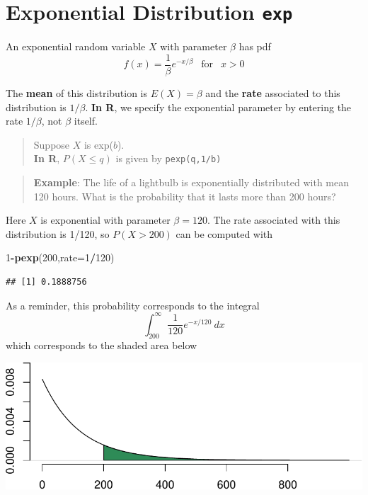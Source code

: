 \documentclass[
]{book}
\newenvironment{Shaded}{\begin{snugshade}}{\end{snugshade}}
\newcommand{\AttributeTok}[1]{\textcolor[rgb]{0.13,0.29,0.53}{#1}}
\newcommand{\DecValTok}[1]{\textcolor[rgb]{0.00,0.00,0.81}{#1}}
\newcommand{\FunctionTok}[1]{\textcolor[rgb]{0.13,0.29,0.53}{\textbf{#1}}}
\newcommand{\NormalTok}[1]{#1}
\newcommand{\SpecialCharTok}[1]{\textcolor[rgb]{0.81,0.36,0.00}{\textbf{#1}}}
\theoremstyle{definition}
\theoremstyle{definition}
\theoremstyle{definition}
\theoremstyle{definition}
\theoremstyle{remark}
\begin{document}
\section{\texorpdfstring{Exponential Distribution \texttt{exp}}{Exponential Distribution exp}}\label{expR}

An exponential random variable \(X\) with parameter \(\beta\) has pdf \[f(x) = \frac{1}{\beta}e^{-x/\beta} ~~\text{ for }~~ x > 0\]

The \textbf{mean} of this distribution is \(E(X) = \beta\) and the \textbf{rate} associated to this distribution is \(1/\beta\). \textbf{In R}, we specify the exponential parameter by entering the rate \(1/\beta\), not \(\beta\) itself.

\begin{quote}
Suppose \(X\) is exp(\(b\)).\\
\textbf{In R}, \(P(X \leq q)\) is given by \texttt{pexp(q,1/b)}
\end{quote}

\begin{quote}
\textbf{Example}: The life of a lightbulb is exponentially distributed with mean 120 hours. What is the probability that it lasts more than 200 hours?
\end{quote}

Here \(X\) is exponential with parameter \(\beta = 120\). The rate associated with this distribution is 1/120, so \(P(X > 200)\) can be computed with

\begin{Shaded}
\begin{Highlighting}[]
\DecValTok{1}\SpecialCharTok{{-}}\FunctionTok{pexp}\NormalTok{(}\DecValTok{200}\NormalTok{,}\AttributeTok{rate=}\DecValTok{1}\SpecialCharTok{/}\DecValTok{120}\NormalTok{)}
\end{Highlighting}
\end{Shaded}

\begin{verbatim}
## [1] 0.1888756
\end{verbatim}

As a reminder, this probability corresponds to the integral
\[\int_{200}^\infty \frac{1}{120}e^{-x/120}~dx\] which corresponds to the shaded area below

\begin{center}\includegraphics{math340-notes_files/figure-latex/unnamed-chunk-178-1} \end{center}
\end{document}
